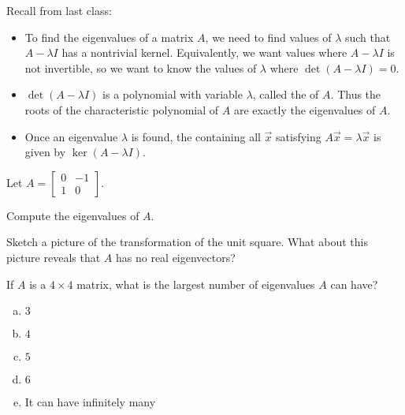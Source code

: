 
\begin{applicationActivities}{4}{28}


\begin{observation}
Recall from last class:
\begin{itemize}
\item To find the eigenvalues of a matrix $A$, we need to find values of $\lambda$ such that $A-\lambda I$ has a nontrivial kernel. Equivalently,
we want values where $A-\lambda I$ is not invertible, so we want to know
the values of \(\lambda\) where $\det(A-\lambda I)=0$.
\item $\det(A-\lambda I)$ is a polynomial with variable \(\lambda\),
called the  of $A$. Thus the roots of
the characteristic polynomial of \(A\) are exactly the eigenvalues of \(A\).
\item Once an eigenvalue \(\lambda\) is found, the 
containing all  \(\vec x\) satisfying
\(A\vec x=\lambda\vec x\) is given by $\ker(A-\lambda I)$.
\end{itemize}
\end{observation}

\begin{activity}{5}
Let  $A=\begin{bmatrix}0 & -1 \\ 1 & 0 \end{bmatrix}$.
  \begin{subactivity}
    Compute the eigenvalues of $A$.
  \end{subactivity}
  \begin{subactivity}
     Sketch a picture of the transformation of the unit square. 
     What about this picture reveals that \(A\) has no real eigenvectors?
   \end{subactivity}
\end{activity}

\begin{activity}{5}
  If $A$ is a $4 \times 4$ matrix, what is the largest number of eigenvalues $A$ can have?
  \begin{enumerate}[(a)]
  \item $3$
  \item $4$
  \item $5$
  \item $6$
  \item It can have infinitely many
  \end{enumerate}
\end{activity}


\end{applicationActivities}
